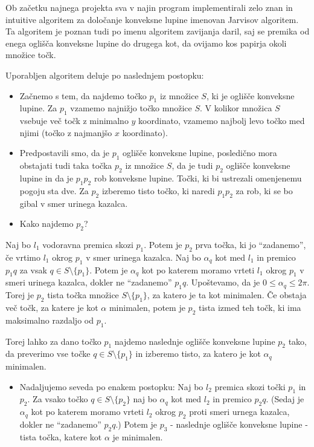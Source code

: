\documentclass[
]{article}
\providecommand{\tightlist}{%
  \setlength{\itemsep}{0pt}\setlength{\parskip}{0pt}}
\begin{document}
Ob začetku najnega projekta sva v najin program implementirali zelo znan
in intuitive algoritem za določanje konveksne lupine imenovan Jarvisov
algoritem. Ta algoritem je poznan tudi po imenu algoritem zavijanja
daril, saj se premika od enega oglišča konveksne lupine do drugega kot,
da ovijamo kos papirja okoli množice točk.

\newline Uporabljen algoritem deluje po naslednjem postopku:

\begin{itemize}
\item
  Začnemo s tem, da najdemo točko \(p_1\) iz množice \(S\), ki je
  oglišče konveksne lupine. Za \(p_1\) vzamemo najnižjo točko množice
  \(S\). V kolikor množica \(S\) vsebuje več točk z minimalno \(y\)
  koordinato, vzamemo najbolj levo točko med njimi (točko z najmanjšo
  \(x\) koordinato).
\item
  Predpostavili smo, da je \(p_1\) oglišče konveksne lupine, posledično
  mora obstajati tudi taka točka \(p_2\) iz množice \(S\), da je tudi
  \(p_2\) oglišče konveksne lupine in da je \(p_1p_2\) rob konveksne
  lupine. Točki, ki bi ustrezali omenjenemu pogoju sta dve. Za \(p_2\)
  izberemo tisto točko, ki naredi \(p_1p_2\) za rob, ki se bo gibal v
  smer urinega kazalca.
\item
  Kako najdemo \(p_2\)?
\end{itemize}

\newline Naj bo \(l_1\) vodoravna premica skozi \(p_1\). Potem je
\(p_2\) prva točka, ki jo ``zadanemo'', če vrtimo \(l_1\) okrog \(p_1\)
v smer urinega kazalca. Naj bo \(\alpha _q\) kot med \(l_1\) in premico
\(p_1q\) za vsak \(q \in S \setminus \lbrace p_1 \rbrace\). Potem je
\(\alpha _q\) kot po katerem moramo vrteti \(l_1\) okrog \(p_1\) v smeri
urinega kazalca, dokler ne ``zadanemo'' \(p_1q\). Upoštevamo, da je
\(0 \leq \alpha _q \leq 2\pi\). Torej je \(p_2\) tista točka množice
\(S \setminus \lbrace p_1 \rbrace\), za katero je ta kot minimalen. Če
obstaja več točk, za katere je kot \(\alpha\) minimalen, potem je
\(p_2\) tista izmed teh točk, ki ima maksimalno razdaljo od \(p_1\).

\newline Torej lahko za dano točko \(p_1\) najdemo naslednje oglišče
konveksne lupine \(p_2\) tako, da preverimo vse točke
\(q \in S \setminus \lbrace p_1 \rbrace\) in izberemo tisto, za katero
je kot \(\alpha _q\) minimalen.

\begin{itemize}
\tightlist
\item
  Nadaljujemo seveda po enakem postopku: Naj bo \(l_2\) premica skozi
  točki \(p_1\) in \(p_2\). Za vsako točko
  \(q \in S \setminus \lbrace p_2 \rbrace\) naj bo \(\alpha _q\) kot med
  \(l_2\) in premico \(p_2q\). (Sedaj je \(\alpha _q\) kot po katerem
  moramo vrteti \(l_2\) okrog \(p_2\) proti smeri urnega kazalca, dokler
  ne ``zadanemo'' \(p_2q\).) Potem je \(p_3\) - naslednje oglišče
  konveksne lupine - tista točka, katere kot \(\alpha\) je minimalen.
\end{itemize}
\end{document}
